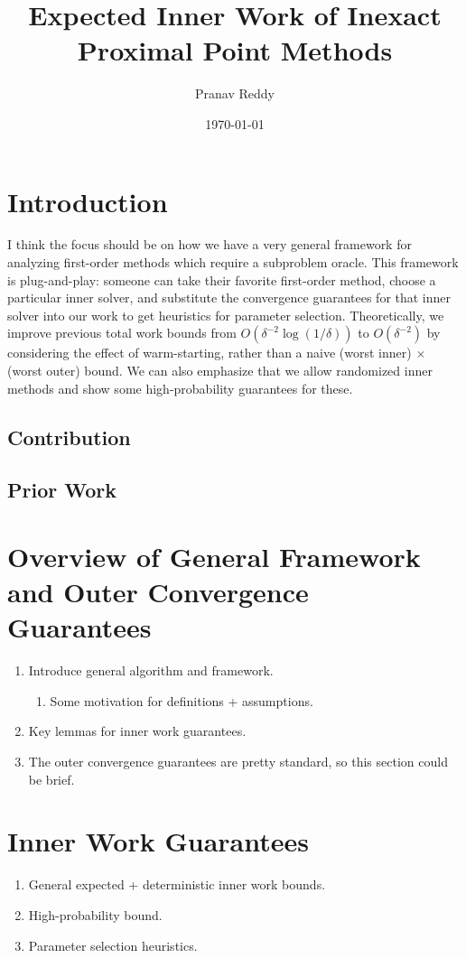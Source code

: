 \documentclass[11pt]{article}
\title{Expected Inner Work of Inexact Proximal Point Methods}
\author{Pranav Reddy}
\date{\small \today \vspace{-5mm}}
\begin{document}
\maketitle
\section{Introduction}
I think the focus should be on how we have a very general framework for analyzing first-order methods which require a subproblem oracle.
This framework is plug-and-play: someone can take their favorite first-order method, choose a particular inner solver, and substitute the convergence guarantees for that inner solver into our work to get heuristics for parameter selection.
Theoretically, we improve previous total work bounds from $O(\delta^{-2}\log(1/\delta))$ to $O(\delta^{-2})$ by considering the effect of warm-starting, rather than a naive (worst inner) $\times$ (worst outer) bound.
We can also emphasize that we allow randomized inner methods and show some high-probability guarantees for these.

\subsection{Contribution}
\subsection{Prior Work}

\section{Overview of General Framework and Outer Convergence Guarantees}
\begin{enumerate}
    \item Introduce general algorithm and framework.
    \begin{enumerate}
        \item Some motivation for definitions + assumptions.
    \end{enumerate}
    \item Key lemmas for inner work guarantees.
    \item The outer convergence guarantees are pretty standard, so this section could be brief.
\end{enumerate}

\section{Inner Work Guarantees}
\begin{enumerate}
    \item General expected + deterministic inner work bounds.
    \item High-probability bound.
    \item Parameter selection heuristics.
\end{enumerate}
\end{document}
